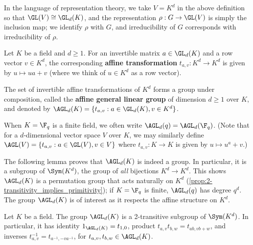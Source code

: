 In the language of representation theory, we take $V = K^d$ in the above definition so that $\GL(V) \cong \GL_d(K)$, and the representation $\rho : G \to \GL(V)$ is simply the inclusion map; we identify $\rho$ with $G$, and irreducibility of $G$ corresponds with irreducibility of $\rho$.

\begin{definition}\label{def:affine_transformation}
    Let $K$ be a field and $d \geq 1$. For an invertible matrix $a \in \GL_d(K)$ and a row vector $v \in K^d$, the corresponding \textbf{affine transformation} $t_{a,v} : K^d \to K^d$ is given by $u \mapsto ua + v$ (where we think of $u \in K^d$ as a row vector).
\end{definition}

\begin{definition}\label{def:agl}
    The set of invertible affine transformations of $K^d$ forms a group under composition, called the \textbf{affine general linear group} of dimension $d \geq 1$ over $K$, and denoted by $\AGL_d(K) = \{t_{a,v} : a \in \GL_d(K), v \in K^d\}$.

    When $K = \F_q$ is a finite field, we often write $\AGL_d(q) = \AGL_d(\F_q)$. (Note that for a $d$-dimensional vector space $V$ over $K$, we may similarly define $\AGL(V) = \{t_{a,v} : a \in \GL(V), v \in V\}$ where $t_{a,v} : K \to K$ is given by $u \mapsto u^a + v$.)
\end{definition}

The following lemma proves that $\AGL_d(K)$ is indeed a group. In particular, it is a  subgroup of $\Sym(K^d)$, the group of \textit{all} bijections $K^d \to K^d$. This shows $\AGL_d(K)$ is a  permutation group that acts naturally on $K^d$ (\autoref{prop:2-transitivity_implies_primitivity}); if $K = \F_q$ is finite, $\AGL_d(q)$ has degree $q^d$. The group $\AGL_d(K)$ is of interest as it respects the affine structure on $K^d$.

\begin{lemma}\label{lem:agl_is_subgroup}
    Let $K$ be a field. The group $\AGL_d(K)$ is a 2-transitive subgroup of $\Sym(K^d)$. In particular, it has identity $1_{\AGL_d(K)} = t_{1,0}$, product $t_{a,v}t_{b,w} = t_{ab,vb+w}$, and inverses $t_{a,v}^{-1} = t_{a^{-1},-va^{-1}}$, for $t_{a,v},t_{b,w} \in \AGL_d(K)$.
\end{lemma}


